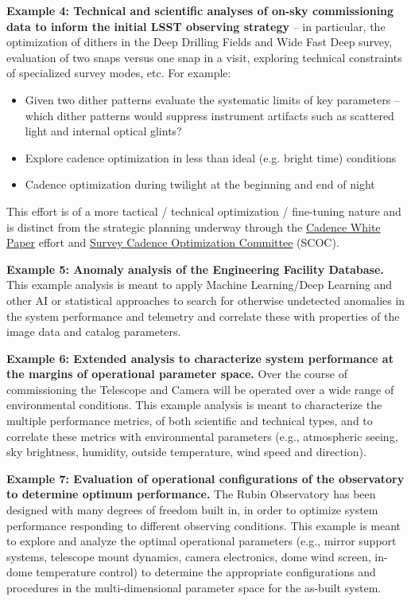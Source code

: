 \documentclass[SE,authoryear,toc,lsstdraft]{lsstdoc}
\begin{document}
\textbf{Example 4: Technical and scientific analyses of on-sky commissioning data to inform the initial LSST observing strategy} -- in particular, the optimization of dithers in the Deep Drilling Fields and Wide Fast Deep survey, evaluation of two snaps versus one snap in a visit, exploring technical constraints of specialized survey modes, etc.  For example:
\begin{itemize}
\item Given two dither patterns evaluate the systematic limits of key parameters -- which dither patterns would suppress instrument artifacts such as scattered light and internal optical glints?
\item Explore cadence optimization in less than ideal (e.g. bright time) conditions
\item Cadence optimization during twilight at the beginning and end of night
\end{itemize}
This effort is of a more tactical / technical optimization / fine-tuning nature and is distinct from the strategic planning underway through the \href{https://www.lsst.org/content/survey-cadence-notes-2021}{Cadence White Paper} effort and \href{https://www.lsst.org/content/charge-survey-cadence-optimization-committee-scoc}{Survey Cadence Optimization Committee} (SCOC).

\textbf{Example 5: Anomaly analysis of the Engineering Facility Database.} This example analysis is meant to apply Machine Learning/Deep Learning and other AI or statistical approaches to search for otherwise undetected anomalies in the system performance and telemetry and correlate these with properties of the image data and catalog parameters.
 
\textbf{Example 6: Extended analysis to characterize system performance at the margins of operational parameter space.} Over the course of commissioning the Telescope and Camera will be operated over a wide range of environmental conditions. This example analysis is meant to characterize the multiple performance metrics, of both scientific and technical types, and to correlate these metrics with environmental parameters (e.g., atmospheric seeing, sky brightness, humidity, outside temperature, wind speed and direction).
 
\textbf{Example 7: Evaluation of operational configurations of the observatory to determine optimum performance.} The Rubin Observatory has been designed with many degrees of freedom built in, in order to optimize system performance responding to different observing conditions. This example is meant to explore and analyze the optimal operational parameters (e.g., mirror support systems, telescope mount dynamics, camera electronics, dome wind screen, in-dome temperature control) to determine the appropriate configurations and procedures in the multi-dimensional parameter space for the as-built system.
\end{document}
